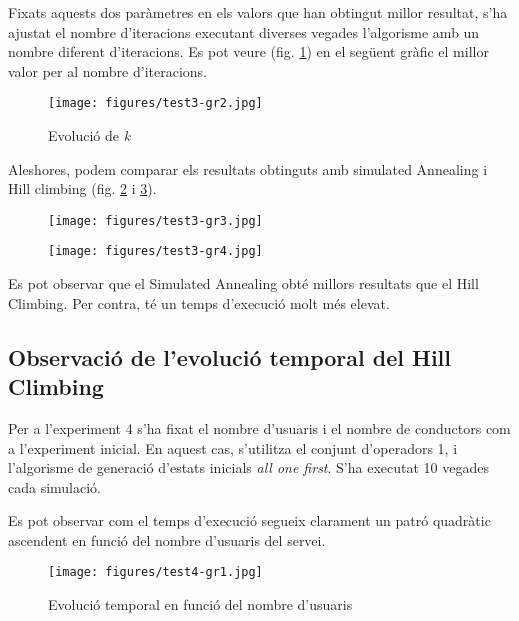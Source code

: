 Fixats aquests dos paràmetres en els valors que han obtingut millor resultat, s'ha ajustat el nombre d'iteracions executant diverses 
vegades l'algorisme amb un nombre diferent d'iteracions. Es pot veure (fig. \ref{test3-gr2}) en el següent gràfic el millor valor per al nombre d'iteracions.

\begin{figure}[H]
\begin{center}
 \texttt{[image: figures/test3-gr2.jpg]}
 \label{test3-gr2}
\caption{Evolució de \emph{k}}
\end{center}
\end{figure}


Aleshores, podem comparar els resultats obtinguts amb simulated Annealing i Hill climbing (fig. \ref{test3-gr3} i \ref{test3-gr4}).


\begin{figure}[H]
\begin{center} 
 \texttt{[image: figures/test3-gr3.jpg]}
\label{test3-gr3}
\caption{}
\end{center}
\end{figure}


\begin{figure}[H]
\begin{center}
 \texttt{[image: figures/test3-gr4.jpg]}
 \label{test3-gr4}
\caption{}
\end{center}
\end{figure}

Es pot observar que el Simulated Annealing obté millors resultats que el Hill Climbing. Per contra, té un temps d'execució molt més elevat.


\subsection{Observació de l'evolució temporal del Hill Climbing}
Per a l'experiment 4 s'ha fixat el nombre d'usuaris i el nombre de conductors com a l'experiment inicial.
En aquest cas, s'utilitza el conjunt d'operadors 1, i l'algorisme de generació d'estats inicials \emph{all one first}.
S'ha executat 10 vegades cada simulació.

Es pot observar com el temps d'execució segueix clarament un patró quadràtic ascendent en funció del nombre d'usuaris
del servei.

\begin{figure}[H]
\begin{center}
 \texttt{[image: figures/test4-gr1.jpg]}
 \label{test4-gr1}
\caption{Evolució temporal en funció del nombre d'usuaris}
\end{center}
\end{figure}


